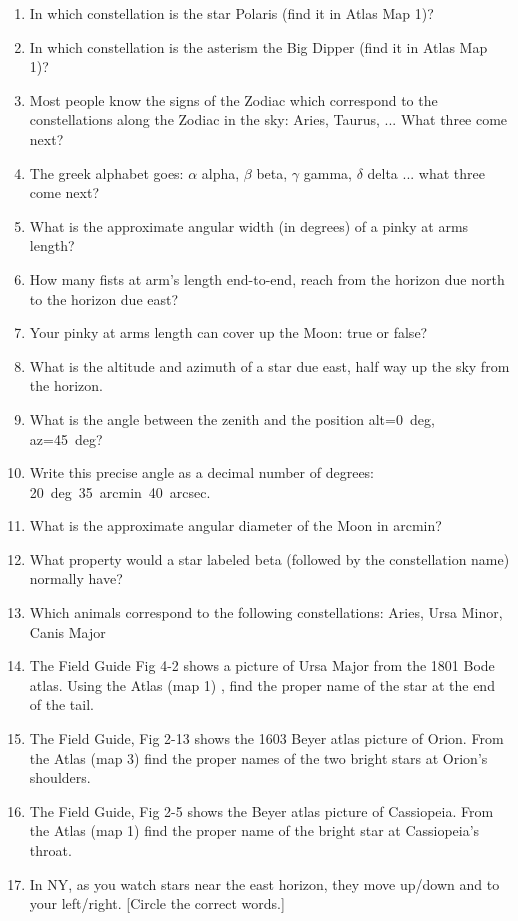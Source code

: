 \documentclass{article}
\begin{document}
\begin{enumerate} 

\item 
In which constellation is the star Polaris (find it in Atlas Map 1)?
\item
In which constellation is the asterism the Big Dipper (find it in
Atlas Map 1)?
\item
Most people know the signs of the Zodiac which correspond to the
constellations along the Zodiac in the sky: Aries, Taurus, ... What
three come next?
\item
The greek alphabet goes: $\alpha$ alpha, $\beta$ beta, $\gamma$ gamma,
$\delta$ delta ... what three come next?
\item
What is the approximate angular width (in degrees) of a pinky at arms
length?
\item
How many fists at arm's length end-to-end, reach from the horizon due
north to the horizon due east?
\item
Your pinky at arms length can cover up the Moon: true or false?
\item
What is the altitude and azimuth of a star due east, half way up the
sky from the horizon.
\item
What is the angle between the zenith and the position alt=0~deg,
az=45~deg?
\item
Write this precise angle as a decimal number of degrees: 20~deg\
35~arcmin\ 40~arcsec.
\item
What is the approximate angular diameter of the Moon in arcmin?
\item
What property would a star labeled beta (followed by the constellation
name) normally have?
\item
Which animals correspond to the following constellations: Aries, Ursa
Minor, Canis Major
\item 
The Field Guide Fig 4-2 shows a picture of Ursa Major from the 1801
Bode atlas.  Using the Atlas (map 1) , find the proper name of the
star at the end of the tail.
\item 
The Field Guide, Fig 2-13 shows the 1603 Beyer atlas picture of
Orion. From the Atlas (map 3) find the proper names of the two bright
stars at Orion's shoulders.
\item 
The Field Guide, Fig 2-5 shows the Beyer atlas picture of
Cassiopeia. From the Atlas (map 1) find the proper name of the bright
star at Cassiopeia's throat.
\item
In NY, as you watch stars near the east horizon, they move up/down and
to your left/right.  [Circle the correct words.]

\end{enumerate}
\end{document}
